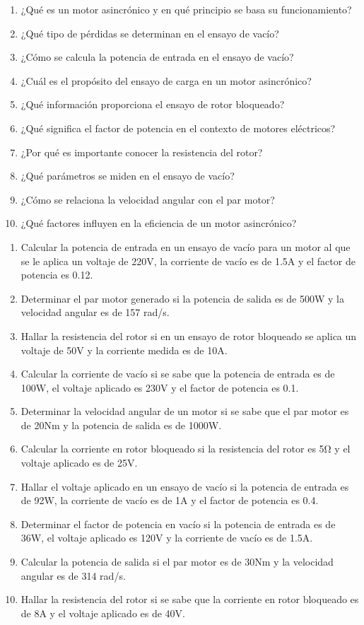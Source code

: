 \documentclass[../main]{subfiles}
\begin{document}
\begin{enumerate}
    \item ¿Qué es un motor asincrónico y en qué principio se basa su funcionamiento?
    \item ¿Qué tipo de pérdidas se determinan en el ensayo de vacío?
    \item ¿Cómo se calcula la potencia de entrada en el ensayo de vacío?
    \item ¿Cuál es el propósito del ensayo de carga en un motor asincrónico?
    \item ¿Qué información proporciona el ensayo de rotor bloqueado?
    \item ¿Qué significa el factor de potencia en el contexto de motores eléctricos?
    \item ¿Por qué es importante conocer la resistencia del rotor?
    \item ¿Qué parámetros se miden en el ensayo de vacío?
    \item ¿Cómo se relaciona la velocidad angular con el par motor?
    \item ¿Qué factores influyen en la eficiencia de un motor asincrónico?
\end{enumerate}


\begin{enumerate}
    \item Calcular la potencia de entrada en un ensayo de vacío para un motor al que se le aplica un voltaje de 220V, la corriente de vacío es de 1.5A y el factor de potencia es 0.12.
    \item Determinar el par motor generado si la potencia de salida es de 500W y la velocidad angular es de 157 rad/s.
    \item Hallar la resistencia del rotor si en un ensayo de rotor bloqueado se aplica un voltaje de 50V y la corriente medida es de 10A.
    \item Calcular la corriente de vacío si se sabe que la potencia de entrada es de 100W, el voltaje aplicado es 230V y el factor de potencia es 0.1.
    \item Determinar la velocidad angular de un motor si se sabe que el par motor es de 20Nm y la potencia de salida es de 1000W.
    \item Calcular la corriente en rotor bloqueado si la resistencia del rotor es 5Ω y el voltaje aplicado es de 25V.
    \item Hallar el voltaje aplicado en un ensayo de vacío si la potencia de entrada es de 92W, la corriente de vacío es de 1A y el factor de potencia es 0.4.
    \item Determinar el factor de potencia en vacío si la potencia de entrada es de 36W, el voltaje aplicado es 120V y la corriente de vacío es de 1.5A.
    \item Calcular la potencia de salida si el par motor es de 30Nm y la velocidad angular es de 314 rad/s.
    \item Hallar la resistencia del rotor si se sabe que la corriente en rotor bloqueado es de 8A y el voltaje aplicado es de 40V.
\end{enumerate}
\end{document}
